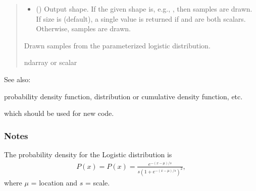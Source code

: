 \documentclass[letterpaper,10pt,english]{sphinxmanual}
\begin{document}
\begin{fulllineitems}
\begin{quote}
\begin{description}
\begin{itemize}
\item {} 
\sphinxAtStartPar
{} (\sphinxstyleliteralemphasis{\sphinxupquote{, }}) \textendash{} Output shape.  If the given shape is, e.g., , then
 samples are drawn.  If size is  (default),
a single value is returned if  and  are both scalars.
Otherwise,  samples are drawn.

\end{itemize}

\sphinxAtStartPar
{} \textendash{} Drawn samples from the parameterized logistic distribution.

\sphinxAtStartPar
ndarray or scalar

\end{description}\end{quote}


\begin{sphinxseealso}{See also:}
\begin{description}
\sphinxAtStartPar
probability density function, distribution or cumulative density function, etc.

\sphinxAtStartPar
which should be used for new code.

\end{description}


\end{sphinxseealso}

\subsubsection*{Notes}

\sphinxAtStartPar
The probability density for the Logistic distribution is
\begin{equation*}
\begin{split}P(x) = P(x) = \frac{e^{-(x-\mu)/s}}{s(1+e^{-(x-\mu)/s})^2},\end{split}
\end{equation*}
\sphinxAtStartPar
where \(\mu\) = location and \(s\) = scale.


\end{fulllineitems}
\end{document}
